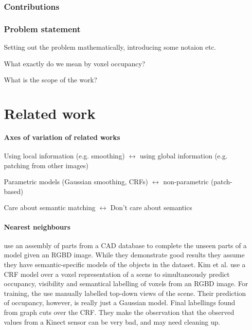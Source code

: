 \documentclass[10pt,a4paper, twocolumn]{article}
\makeatletter
\newcommand*{\eg}{e.g.\@\xspace}
\newcommand*{\ea}{et al.\@\xspace}
\makeatother
\begin{document}
\subsubsection{Contributions}


\subsubsection{Problem statement}

Setting out the problem mathematically, introducing some notaion etc.

What exactly do we mean by voxel occupancy?

What is the scope of the work? 

\section{Related work}

\paragraph{Axes of variation of related works}
Using local information (\eg smoothing) $\leftrightarrow$ using global information (\eg patching from other images)

Parametric models (Gaussian smoothing, CRFs) $\leftrightarrow$ non-parametric (patch-based)

Care about semantic matching $\leftrightarrow$ Don't care about semantics


\paragraph{Nearest neighbours}
\cite{shen-tog-2012} use an assembly of parts from a CAD database to complete the unseen parts of a model given an RGBD image. 
While they demonstrate good results they assume they have semantic-specific models of the objects in the dataset.
Kim \ea \cite{kim-iccv-2013} use a CRF model over a voxel representation of a scene to simultaneously predict occupancy, visibility and semantical labelling of voxels from an RGBD image. 
For training, the use manually labelled top-down views of the scene. 
Their prediction of occupancy, however, is really just a Gaussian model. 
Final labellings found from graph cuts over the CRF. 
They make the observation that the observed values from a Kinect sensor can be very bad, and may need cleaning up.
\end{document}
